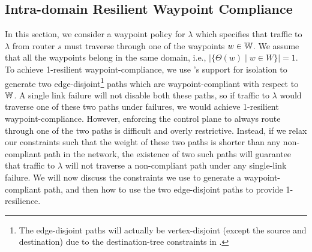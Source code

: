 
%









\subsection{Intra-domain Resilient Waypoint Compliance}\label{sec:ospfwaypoint}
In this section, we consider a waypoint policy for $\lambda$ which
specifies that traffic to $\lambda$ from router $s$ 
must traverse through
one of the waypoints $w \in \mathbb{W}$. We assume that 
all the waypoints belong in the same domain, i.e., 
$|\{\Theta(w) \mid w \in W\}| = 1$.
To achieve 1-resilient waypoint-compliance, we use \genesis's
support for isolation to generate two edge-disjoint\footnote
{The edge-disjoint paths will actually be vertex-disjoint (except the 
	source and destination) due to the destination-tree constraints
	in \genesis.} paths
which are waypoint-compliant with respect to $\mathbb{W}$. A single link
failure will not disable both these paths, so if traffic to $\lambda$ 
would 
traverse one of these two paths under failures, 
we would achieve 1-resilient
waypoint-compliance. However, enforcing the control plane to 
always route through one of the two paths is difficult and overly 
restrictive. 
Instead, if we relax our constraints such that the weight
of these two paths is shorter than any non-compliant path in 
the network, the existence of two such paths will guarantee
that traffic to $\lambda$ will not traverse a non-compliant
path under any single-link failure. 
We will now discuss the
constraints we use to generate 
a waypoint-compliant path, and then 
how to use the two edge-disjoint 
paths to provide 1-resilience. 


